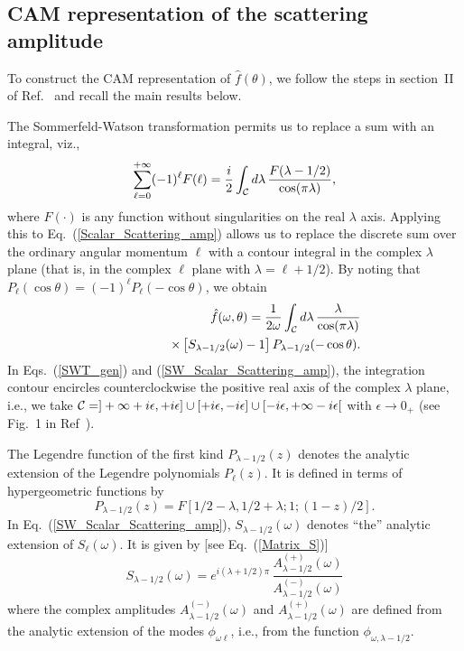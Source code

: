 \documentclass[aps,prd,longbibliography,reprint,twocolumn,amsmath,amssymb,amsfonts,showpacs,superscriptaddress]{revtex4-1}%
\begin{document}
\subsection{CAM representation of the scattering amplitude}
\label{SecIIc}

To construct the CAM representation of $\hat{f}(\theta)$, we follow the steps in section~II of Ref.~\cite{Folacci:2019cmc} and recall the main results below.

The Sommerfeld-Watson transformation \cite{Watson18,Sommerfeld49,Newton:1982qc} permits us to replace a sum with an integral, viz.,
\begin{equation}\label{SWT_gen}
\sum_{\ell=0}^{+\infty} (-1)^\ell F(\ell)= \frac{i}{2} \int_{\cal C} d\lambda \, \frac{F(\lambda -1/2)}{\cos (\pi \lambda)} ,
\end{equation}
where $F(\cdot)$ is any function without singularities on the real $\lambda$ axis. Applying this to Eq.~(\ref{Scalar_Scattering_amp}) allows us to replace the discrete sum over the ordinary angular momentum $\ell$ with a contour integral in the complex $\lambda$ plane (that is, in the complex $\ell$ plane with $\lambda = \ell +1/2$). By noting that $P_\ell (\cos \theta)=(-1)^\ell P_\ell (-\cos \theta)$, we obtain
\begin{eqnarray}\label{SW_Scalar_Scattering_amp}
& & \hat{f}(\omega,\theta) = \frac{1}{2 \omega}  \int_{\cal C} d\lambda \, \frac{\lambda}{\cos (\pi \lambda)} \nonumber \\
&&  \qquad\qquad   \times \left[ S_{\lambda -1/2} (\omega) -1 \right]P_{\lambda -1/2} (-\cos \theta).
\end{eqnarray}
In Eqs.~(\ref{SWT_gen}) and (\ref{SW_Scalar_Scattering_amp}), the integration contour encircles counterclockwise the positive real axis of the complex $\lambda$ plane, i.e., we take ${\cal C}=]+\infty +i\epsilon,+i\epsilon] \cup
[+i\epsilon,-i\epsilon] \cup [-i\epsilon, +\infty -i\epsilon[$ with $\epsilon \to 0_+$ (see Fig.~1 in Ref~\cite{Folacci:2019cmc}).

The Legendre function of the first kind $P_{\lambda -1/2} (z)$ denotes the analytic extension of the Legendre polynomials $P_\ell (z)$. It is defined in terms of hypergeometric functions by \cite{AS65}
\begin{equation}\label{Def_ext_LegendreP}
P_{\lambda -1/2} (z) = F[1/2-\lambda,1/2+\lambda;1;(1-z)/2].
\end{equation}
In Eq.~(\ref{SW_Scalar_Scattering_amp}), $S_{\lambda -1/2} (\omega)$ denotes ``the'' analytic extension of $S_\ell (\omega)$. It is given by [see Eq.~(\ref{Matrix_S})]
\begin{equation}\label{Matrix_S_CAM}
  S_{\lambda -1/2}(\omega) =  e^{i(\lambda + 1/2)\pi} \, \frac{A_{\lambda -1/2}^{(+)}(\omega)}{A_{\lambda -1/2}^{(-)}(\omega)}
\end{equation}
where the complex amplitudes $A^{(-)}_{\lambda -1/2} (\omega)$ and  $A^{(+)}_{\lambda -1/2} (\omega)$ are defined from the analytic extension of the modes $\phi_{\omega \ell}$, i.e., from the function $\phi_{\omega ,\lambda -1/2}$.
\end{document}
